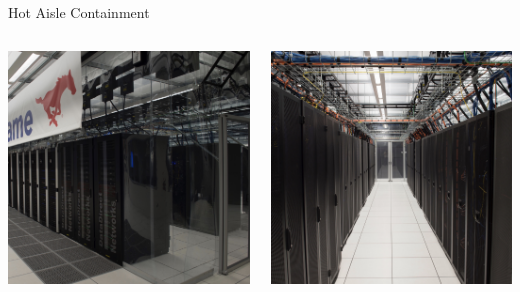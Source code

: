 \begin{frame}{Hot Aisle Containment}
\begin{columns}
\begin{column}{0.5\textwidth}
\begin{center}
\includegraphics[width=\textwidth]{figures/hot_aisle_1.jpg}
\end{center}
\end{column}
\begin{column}{0.5\textwidth}
\begin{center}
\includegraphics[width=\textwidth]{figures/hot_aisle_2.jpg}
\end{center}
\end{column}
\end{columns}
\end{frame}

